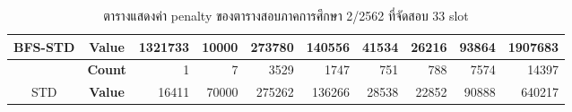 \begin{table}[]
{\begin{tabular}{@{}ccrrrrrrrr@{}}
    \multirow{-2}{*}{BFS-STD}                    & \textbf{Value}                        & 1321733                        & 10000                          & 273780                         & 140556                         & 41534                          & 26216                          & 93864                          & 1907683                          \\ \midrule
                                                  & {\textbf{Count}} & {1}       & {7}       & {3529}    & {1747}    & {751}     & {788}     & {7574}    & {14397}     \\ \cmidrule(l){2-10} 
    \multirow{-2}{*}{STD} & {\textbf{Value}} & {16411}   & {70000}   & {275262}  & {136266}  & {28538}   & {22852}   & {90888}   & {640217}    \\ \bottomrule
    \end{tabular}%
    }
    \caption{ตารางแสดงค่า penalty ของตารางสอบภาคการศึกษา 2/2562 ที่จัดสอบ 33 slot}
    \label{tab:result_table_262_33}
\end{table}
